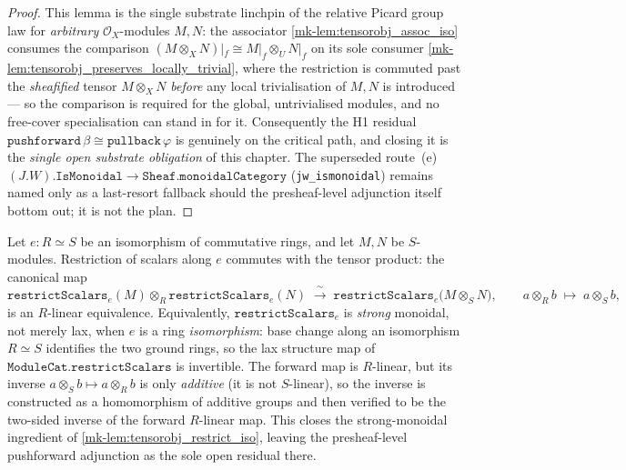 \begin{proof}
  This lemma is the single substrate linchpin of the relative Picard group law for
  \emph{arbitrary} \(\mathcal{O}_X\)-modules \(M, N\): the associator
  \ref{mk-lem:tensorobj_assoc_iso} consumes the comparison
  \((M \otimes_X N)|_f \cong M|_f \otimes_U N|_f\) on its sole consumer
  \ref{mk-lem:tensorobj_preserves_locally_trivial}, where the restriction is commuted
  past the \emph{sheafified} tensor \(M \otimes_X N\) \emph{before} any local
  trivialisation of \(M, N\) is introduced --- so the comparison is required for the
  global, untrivialised modules, and no free-cover specialisation can stand in for it.
  Consequently the H1 residual \(\mathtt{pushforward}\,\beta \cong
  \mathtt{pullback}\,\varphi\) is genuinely on the critical path, and closing it is
  the \emph{single open substrate obligation} of this chapter. The superseded
  route~(e) \((J.W).\mathtt{IsMonoidal} \to \mathtt{Sheaf.monoidalCategory}\)
  (\texttt{jw\_ismonoidal}) remains named only as a last-resort fallback should the
  presheaf-level adjunction itself bottom out; it is not the plan.
\end{proof}

\begin{lemma}\label{mk-lem:restrictscalars_ringiso_tensorequiv}
  \leanok

  Let \(e : R \simeq S\) be an isomorphism of commutative rings, and let \(M, N\) be
  \(S\)-modules. Restriction of scalars along \(e\) commutes with the tensor
  product: the canonical map
  \[
    \mathtt{restrictScalars}_e(M) \otimes_R \mathtt{restrictScalars}_e(N)
      \;\xrightarrow{\ \sim\ }\;
    \mathtt{restrictScalars}_e\bigl(M \otimes_S N\bigr),
    \qquad a \otimes_R b \;\longmapsto\; a \otimes_S b,
  \]
  is an \(R\)-linear equivalence. Equivalently, \(\mathtt{restrictScalars}_e\) is
  \emph{strong} monoidal, not merely lax, when \(e\) is a ring \emph{isomorphism}:
  base change along an isomorphism \(R \simeq S\) identifies the two ground rings, so
  the lax structure map of \(\mathtt{ModuleCat.restrictScalars}\) is invertible. The
  forward map is \(R\)-linear, but its inverse \(a \otimes_S b \mapsto a \otimes_R b\)
  is only \emph{additive} (it is not \(S\)-linear), so the inverse is constructed as
  a homomorphism of additive groups and then verified to be the two-sided inverse of
  the forward \(R\)-linear map. This closes the strong-monoidal ingredient of
  \ref{mk-lem:tensorobj_restrict_iso}, leaving the presheaf-level pushforward
  adjunction as the sole open residual there.
\end{lemma}

